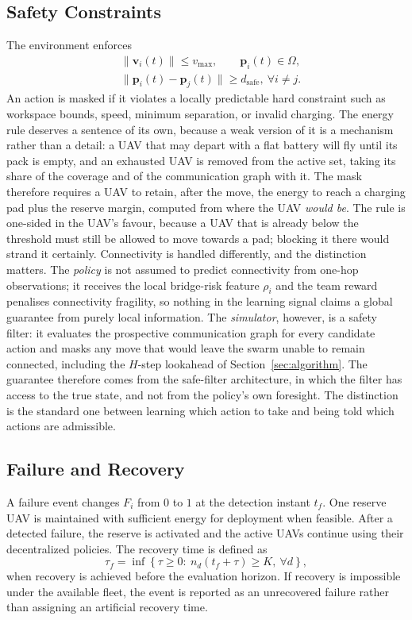 \documentclass[conference]{IEEEtran}
\begin{document}
\subsection{Safety Constraints}
\label{sec:safety_model}
The environment enforces
\begin{equation}
\begin{split}
&\|\mathbf v_i(t)\|\le v_{\max},\qquad \mathbf p_i(t)\in\Omega,\\
&\|\mathbf p_i(t)-\mathbf p_j(t)\|\ge d_{\mathrm{safe}},\ \forall i\ne j.
\end{split}
\label{eq:safety}
\end{equation}
An action is masked if it violates a locally predictable hard constraint such as workspace bounds, speed, minimum separation, or invalid charging. The energy rule deserves a sentence of its own, because a weak version of it is a mechanism rather than a detail: a UAV that may depart with a flat battery will fly until its pack is empty, and an exhausted UAV is removed from the active set, taking its share of the coverage and of the communication graph with it. The mask therefore requires a UAV to retain, after the move, the energy to reach a charging pad plus the reserve margin, computed from where the UAV \emph{would be}. The rule is one-sided in the UAV's favour, because a UAV that is already below the threshold must still be allowed to move towards a pad; blocking it there would strand it certainly. Connectivity is handled differently, and the distinction matters. The \emph{policy} is not assumed to predict connectivity from one-hop observations; it receives the local bridge-risk feature $\rho_i$ and the team reward penalises connectivity fragility, so nothing in the learning signal claims a global guarantee from purely local information. The \emph{simulator}, however, is a safety filter: it evaluates the prospective communication graph for every candidate action and masks any move that would leave the swarm unable to remain connected, including the $H$-step lookahead of Section~\ref{sec:algorithm}. The guarantee therefore comes from the safe-filter architecture, in which the filter has access to the true state, and not from the policy's own foresight. The distinction is the standard one between learning which action to take and being told which actions are admissible.

\subsection{Failure and Recovery}
A failure event changes $F_i$ from $0$ to $1$ at the detection instant $t_f$. One reserve UAV is maintained with sufficient energy for deployment when feasible. After a detected failure, the reserve is activated and the active UAVs continue using their decentralized policies. The recovery time is defined as
\begin{equation}
\tau_f=\inf\left\{\tau\ge0:\ n_d(t_f+\tau)\ge K,\ \forall d\right\},
\label{eq:recovery}
\end{equation}
when recovery is achieved before the evaluation horizon. If recovery is impossible under the available fleet, the event is reported as an unrecovered failure rather than assigning an artificial recovery time.
\end{document}
